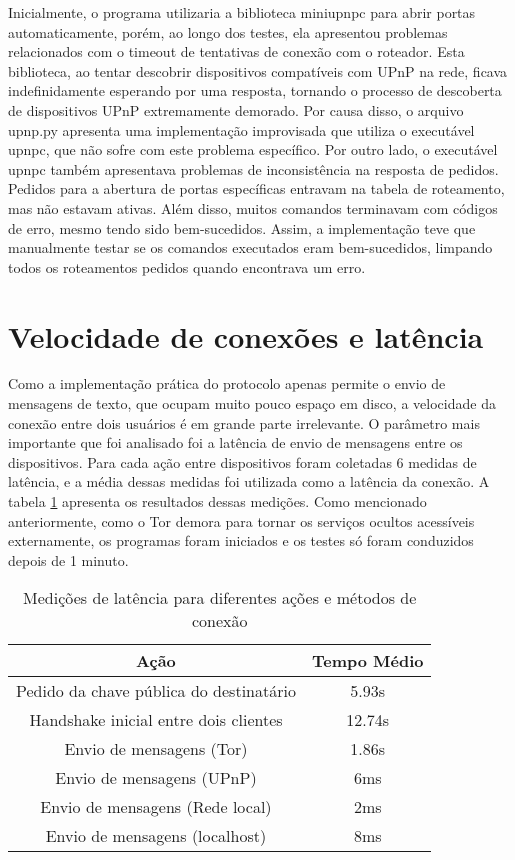 Inicialmente, o programa utilizaria a biblioteca miniupnpc para abrir portas automaticamente, porém, ao longo dos testes, ela apresentou problemas relacionados com o timeout de tentativas de conexão com o roteador. Esta biblioteca, ao tentar descobrir dispositivos compatíveis com UPnP na rede, ficava indefinidamente esperando por uma resposta, tornando o processo de descoberta de dispositivos UPnP extremamente demorado. Por causa disso, o arquivo upnp.py apresenta uma implementação improvisada que utiliza o executável upnpc, que não sofre com este problema específico. Por outro lado, o executável upnpc também apresentava problemas de inconsistência na resposta de pedidos. Pedidos para a abertura de portas específicas entravam na tabela de roteamento, mas não estavam ativas. Além disso, muitos comandos terminavam com códigos de erro, mesmo tendo sido bem-sucedidos. Assim, a implementação teve que manualmente testar se os comandos executados eram bem-sucedidos, limpando todos os roteamentos pedidos quando encontrava um erro.

\section{Velocidade de conexões e latência}

Como a implementação prática do protocolo apenas permite o envio de mensagens de texto, que ocupam muito pouco espaço em disco, a velocidade da conexão entre dois usuários é em grande parte irrelevante. O parâmetro mais importante que foi analisado foi a latência de envio de mensagens entre os dispositivos. Para cada ação entre dispositivos foram coletadas 6 medidas de latência, e a média dessas medidas foi utilizada como a latência da conexão. A tabela \ref{tab:latencia} apresenta os resultados dessas medições. Como mencionado anteriormente, como o Tor demora para tornar os serviços ocultos acessíveis externamente, os programas foram iniciados e os testes só foram conduzidos depois de 1 minuto.

\begin{table}[H]
\centering
\begin{tabular}{|c|c|}
\hline
\textbf{Ação} & \textbf{Tempo Médio} \\ \hline
Pedido da chave pública do destinatário & 5.93s \\ \hline
Handshake inicial entre dois clientes & 12.74s \\ \hline
Envio de mensagens (Tor) & 1.86s \\ \hline
Envio de mensagens (UPnP) & 6ms \\ \hline
Envio de mensagens (Rede local) & 2ms \\ \hline
Envio de mensagens (localhost) & 8ms \\ \hline
\end{tabular}
\caption{Medições de latência para diferentes ações e métodos de conexão}
\label{tab:latencia}
\end{table}

